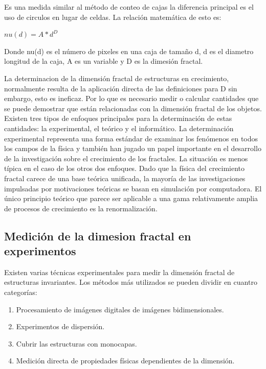 \documentclass[11pt]{article}
\begin{document}
Es una medida similar al método de conteo de cajas la diferencia principal es el uso de circulos en lugar de celdas. La relación matemática de esto es:

$nu(d) = A*d^D$

Donde nu(d) es el número de pixeles en una caja de tamaño d, d es el diametro longitud de la caja, A es un variable y D es la dimesión fractal. 


La determinacion de la dimensión fractal de estructuras en crecimiento, normalmente resulta de la aplicación directa de las definiciones para D sin embargo, esto es ineficaz. Por lo que es necesario medir o calcular cantidades que se puede demostrar que están relacionadas con la dimensión fractal de los objetos. Existen  tres tipos de enfoques principales para la determinación de estas cantidades: la experimental, el teórico y el informático. La determinación experimental representa una forma estándar de examinar los fenómenos en todos los campos de la física y también han jugado un papel importante en el desarrollo de la investigación sobre el crecimiento de los fractales. La situación es menos típica en el caso de los otros dos enfoques. Dado que la física del crecimiento fractal carece de una base teórica unificada, la mayoría de las investigaciones impulsadas por motivaciones teóricas se basan en simulación por computadora. El único principio teórico que parece ser aplicable a una gama relativamente amplia de procesos de crecimiento es la renormalización.

\clearpage


\subsection{Medición de la dimesion fractal en experimentos}

Existen varias técnicas experimentales para medir la dimensión fractal de estructuras invariantes. Los métodos más utilizados se pueden dividir en cuantro categorías:

\begin{enumerate}
\item Procesamiento de imágenes digitales de imágenes bidimensionales.
\item Experimentos de dispersión.
\item Cubrir las estructuras con monocapas. 
\item Medición directa de propiedades físicas dependientes de la dimensión.
\end{enumerate}
\end{document}
